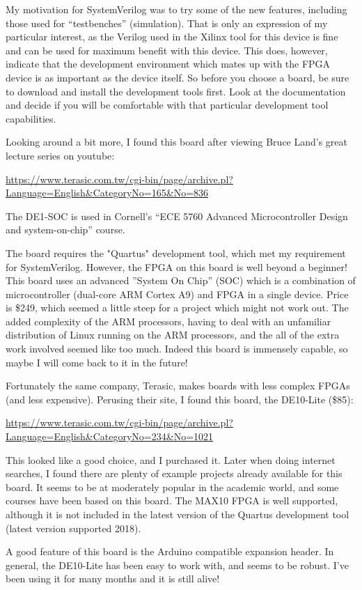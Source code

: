 My motivation for SystemVerilog was to try some of the new features, including those used for ``testbenches'' (simulation).  That is only an expression of my particular interest, as the Verilog used in the Xilinx tool for this device is fine and can be used for maximum benefit with this device.  This does, however, indicate that the development environment which mates up with the FPGA device is as important as the device itself.  So before you choose a board, be sure to download and install the development tools first.  Look at the documentation and decide if you will be comfortable with that particular development tool capabilities.

Looking around a bit more, I found this board after viewing Bruce Land's great lecture series on youtube:

\url{https://www.terasic.com.tw/cgi-bin/page/archive.pl?Language=English&CategoryNo=165&No=836}

The DE1-SOC is used in Cornell's ``ECE 5760 Advanced Microcontroller Design and system-on-chip'' course.

The board requires the "Quartus" development tool, which met my requirement for SystemVerilog.  However, the FPGA on this board is well beyond a beginner!  This board uses an advanced ''System On Chip'' (SOC) which is a combination of microcontroller (dual-core ARM Cortex A9) and FPGA in a single device.  Price is \$249, which seemed a little steep for a project which might not work out.  The added complexity of the ARM processors, having to deal with an unfamiliar distribution of Linux running on the ARM processors, and the all of the extra work involved seemed like too much.  Indeed this board is immensely capable, so maybe I will come back to it in the future!

Fortunately the same company, Terasic, makes boards with less complex FPGAs (and less expensive).  Perusing their site, I found this board, the DE10-Lite (\$85):

\url{https://www.terasic.com.tw/cgi-bin/page/archive.pl?Language=English&CategoryNo=234&No=1021}

This looked like a good choice, and I purchased it.  Later when doing internet searches, I found there are plenty of example projects already available for this board.  It seems to be at moderately popular in the academic world, and some courses have been based on this board.  The MAX10 FPGA is well supported, although it is not included in the latest version of the Quartus development tool (latest version supported 2018).

A good feature of this board is the Arduino compatible expansion header.  In general, the DE10-Lite has been easy to work with, and seems to be robust.  I've been using it for many months and it is still alive!



